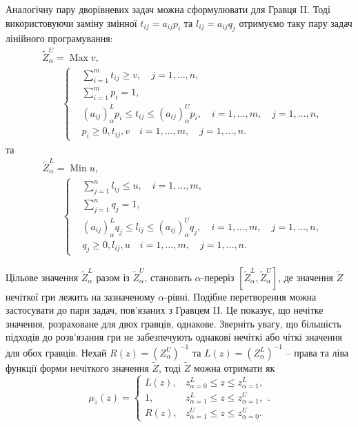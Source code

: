 \documentclass[14pt, a4paper, oneside]{extarticle}
\numberwithin{equation}{section}
\newcommand{\geqslant}{\geq}
\newcommand{\leqslant}{\leq}
\begin{document}
Аналогічну пару дворівневих задач можна сформулювати для Гравця II. Тоді використовуючи заміну змінної $t_{i j}=a_{i j} p_{i}$ та $l_{i j}=a_{i j} q_{j}$ отримуємо таку пару задач лінійного програмування:
\begin{equation}
\begin{aligned}
& \tilde{Z}_{\alpha}^{U}= \operatorname{Max} v, \\
& \qquad\left\{\begin{aligned}
& \sum_{i=1}^{m} t_{i j} \geqslant v, \quad j=1, \ldots, n, \\
& \sum_{i=1}^{m} p_{i}=1, \\
& \left(a_{i j}\right)_{\alpha}^{L} p_{i} \leqslant t_{i j} \leqslant\left(a_{i j}\right)_{\alpha}^{U} p_{i}, \quad i=1, \ldots, m,\quad j=1, \ldots, n, \\
& p_{i} \geqslant 0, t_{i j}, v \quad i=1, \ldots, m, \quad j=1, \ldots, n .
\end{aligned}\right.
\end{aligned}
\end{equation}
та
\begin{equation}
\begin{aligned}
& \tilde{Z}_{\alpha}^{L}= \operatorname{Min} u, \\
& \qquad\left\{\begin{aligned}
& \sum_{j=1}^{n} l_{i j} \leqslant u, \quad i=1, \ldots, m, \\
& \sum_{j=1}^{n} q_{j}=1, \\
& \left(a_{i j}\right)_{\alpha}^{L} q_{j} \leqslant l_{i j} \leqslant\left(a_{i j}\right)_{\alpha}^{U} q_{j}, \quad i=1, \ldots, m,\quad j=1, \ldots, n, \\
& q_{j} \geqslant 0, l_{i j}, u \quad i=1, \ldots, m,\quad j=1, \ldots, n .
\end{aligned}\right.
\end{aligned}
\end{equation}

Цільове значення $\tilde{Z}_{\alpha}^{L}$ разом із $\tilde{Z}_{\alpha}^{U}$, становить $\alpha$-переріз $\left[\tilde{Z}_{\alpha}^{L}, \tilde{Z}_{\alpha}^{U}\right]$, де значення $\tilde {Z}$ нечіткої гри лежить на зазначеному $\alpha$-рівні. Подібне перетворення можна застосувати до пари задач, пов’язаних з Гравцем II. Це показує, що нечітке значення, розраховане для двох гравців, однакове. Зверніть увагу, що більшість підходів до розв’язання гри не забезпечують однакові нечіткі або чіткі значення для обох гравців. Нехай $R(z)=\left(Z_{\alpha}^{U}\right)^{-1}$ та $L(z)=\left(Z_{\alpha}^{L}\right) ^{-1}$ -- права та ліва функції форми нечіткого значення $\tilde{Z}$, тоді $\tilde{Z}$ можна отримати як
\begin{equation}
\mu_{\tilde{z}}(z)=\left\{\begin{array}{ll}
L(z), & z_{\alpha=0}^{L} \leqslant z \leqslant z_{\alpha=1}^{L}, \\
1, & z_{\alpha=1}^{L} \leqslant z \leqslant z_{\alpha=1}^{U}, \\
R(z), & z_{\alpha=1}^{U} \leqslant z \leqslant z_{\alpha=0}^{U} .
\end{array} .\right.
\end{equation}
\end{document}
